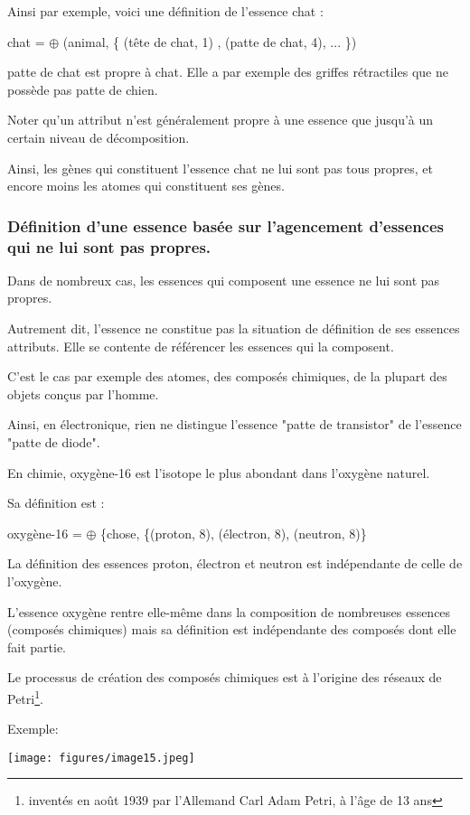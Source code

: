\documentclass[a4paper, 12pt, openright, french]{book}
\begin{document}
Ainsi par exemple, voici une définition de l'essence
chat :

chat = $\oplus$ (animal, \{ (tête de chat, 1) , (patte de chat, 4), ... \})

patte de chat est propre à chat. Elle a par exemple des griffes
rétractiles que ne possède pas patte de chien.

Noter qu'un attribut n'est généralement
propre à une essence que jusqu'à un certain niveau de
décomposition.

Ainsi, les gènes qui constituent l'essence chat ne lui
sont pas tous propres, et encore moins les atomes qui constituent ses
gènes.

\subsubsection{Définition d'une essence basée sur
l'agencement d'essences qui ne lui sont
pas propres.}

Dans de nombreux cas, les essences qui composent une essence ne lui sont
pas propres.

Autrement dit, l'essence ne constitue pas la situation
de définition de ses essences attributs. Elle se contente de référencer
les essences qui la composent.

C'est le cas par exemple des atomes, des composés
chimiques, de la plupart des objets conçus par l'homme.

Ainsi, en électronique, rien ne distingue l'essence
"patte de transistor" de l'essence "patte de diode".

En chimie, oxygène-16 est l'isotope le plus abondant
dans l'oxygène naturel.

Sa définition est :

oxygène-16 = $\oplus$ \{chose, \{(proton, 8), (électron, 8), (neutron, 8)\}

La définition des essences proton, électron et neutron est indépendante
de celle de l'oxygène.

L'essence oxygène rentre elle-même dans la composition
de nombreuses essences (composés chimiques) mais sa définition est
indépendante des composés dont elle fait partie.

\newpage
Le processus de création des composés chimiques est à
l'origine des réseaux de Petri\footnote{inventés en août 1939 par l'Allemand
	Carl Adam Petri, à l'âge de 13 ans}.

Exemple:

\texttt{[image: figures/image15.jpeg]}
\end{document}
